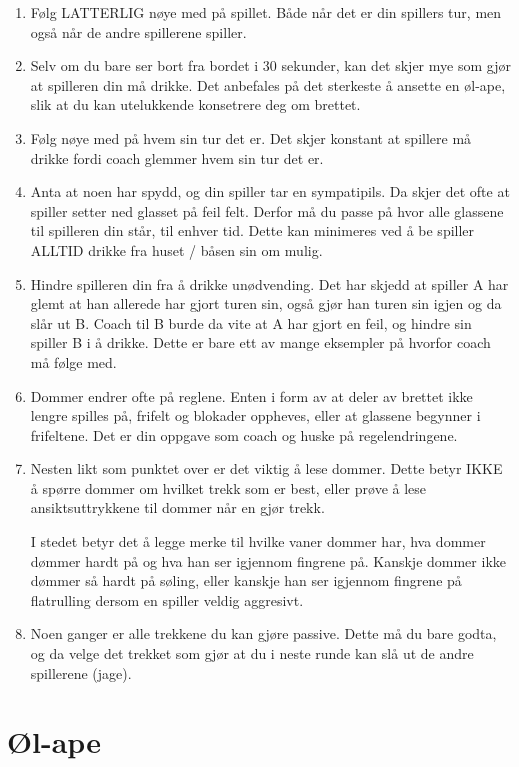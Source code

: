 \documentclass[10pt,a4paper,norsk,openany]{book}
\begin{document}
\begin{enumerate}
    \item Følg LATTERLIG nøye med på spillet. Både når det er din spillers tur,
    men også når de andre spillerene spiller. 
  \item Selv om du bare ser bort fra bordet i 30 sekunder, kan det skjer
    mye som gjør at spilleren din må drikke. Det anbefales på det sterkeste å
    ansette en øl-ape, slik at du kan utelukkende konsetrere deg om brettet. 
  \item Følg nøye med på hvem sin tur det er. Det skjer konstant at spillere må
    drikke fordi coach glemmer hvem sin tur det er.
  \item Anta at noen har spydd, og din spiller tar en sympatipils. Da skjer det
    ofte at spiller setter ned glasset på feil felt. Derfor må du passe på hvor
    alle glassene til spilleren din står, til enhver tid. Dette kan minimeres
    ved å be spiller ALLTID drikke fra huset / båsen sin om mulig.
  \item Hindre spilleren din fra å drikke unødvending. Det har skjedd at spiller
    A har glemt at han allerede har gjort turen sin, også gjør han turen sin
    igjen og da slår ut B. Coach til B burde da vite at A har gjort en feil, og
    hindre sin spiller B i å drikke. Dette er bare ett av mange eksempler på
    hvorfor coach må følge med.
  \item Dommer endrer ofte på reglene. Enten i form av at deler av brettet ikke
    lengre spilles på, frifelt og blokader oppheves, eller at glassene begynner
    i frifeltene. Det er din oppgave som coach og huske på regelendringene.
  \item Nesten likt som punktet over er det viktig å lese dommer. Dette betyr
    IKKE å spørre dommer om hvilket trekk som er best, eller prøve å lese
    ansiktsuttrykkene til dommer når en gjør trekk.

    I stedet betyr det å legge merke til hvilke vaner dommer har, hva dommer
    dømmer hardt på og hva han ser igjennom fingrene på. Kanskje dommer ikke
    dømmer så hardt på søling, eller kanskje han ser igjennom fingrene på
    flatrulling dersom en spiller veldig aggresivt.
  \item Noen ganger er alle trekkene du kan gjøre passive. Dette må du bare
    godta, og da velge det trekket som gjør at du i neste runde kan slå ut de
    andre spillerene (jage).
\end{enumerate}

\section{Øl-ape}
\label{sec:ol-ape}
\end{document}
